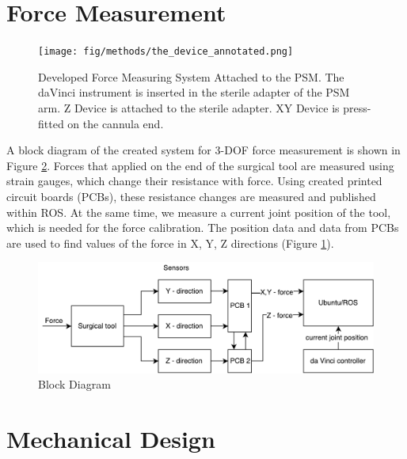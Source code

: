 \section{Force Measurement}
\label{sec:sysArch}

\begin{figure}[h]
	\begin{center}
	\texttt{[image: fig/methods/the\_device\_annotated.png]}
	\end{center}
	\vspace{-4mm}
	\caption[Developed Force Measuring System Attached to the PSM]
	{Developed Force Measuring System Attached to the PSM. The daVinci instrument is inserted in the sterile adapter of the PSM arm. Z Device is attached to the sterile adapter. XY Device is press-fitted on the cannula end.}
	\label{fig:PSM_with_FF}
	\vspace{-2mm}
\end{figure}

A block diagram of the created system for 3-DOF force measurement is shown in Figure \ref{fig:BlockDiag}. Forces that applied on the end of the surgical tool are measured using strain gauges, which change their resistance with force. Using created printed circuit boards (PCBs), these resistance changes are measured and published within ROS. At the same time, we measure a current joint position of the tool, which is needed for the force calibration. The position data and data from PCBs are used to find values of the force in X, Y, Z directions (Figure \ref{fig:PSM_with_FF}).

\begin{figure}[h]
	\begin{center}
		\includegraphics[width=140mm]{fig/methods/dbd2.pdf}
	\end{center}
	\vspace{-4mm}
	\caption[Block Diagram]
	{Block Diagram}
	\label{fig:BlockDiag}
	\vspace{-2mm}
\end{figure}


\section{Mechanical Design}
\label{sec:mechDes}

